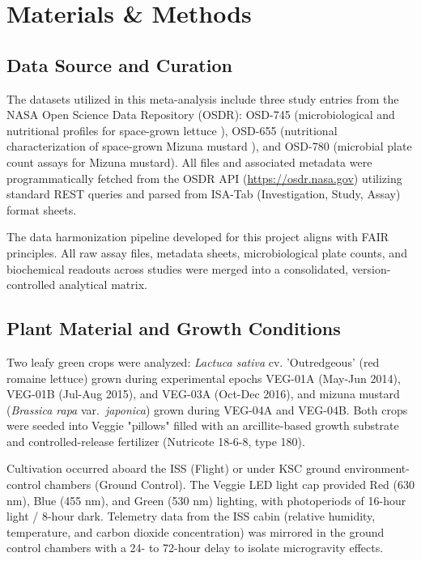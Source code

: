 \chapter{Materials \& Methods}
\label{ch:methods}

\section{Data Source and Curation}
The datasets utilized in this meta-analysis include three study entries from the NASA Open Science Data Repository (OSDR): OSD-745 (microbiological and nutritional profiles for space-grown lettuce \cite{khodadad2020}), OSD-655 (nutritional characterization of space-grown Mizuna mustard \cite{bunchek2024}), and OSD-780 (microbial plate count assays for Mizuna mustard). All files and associated metadata were programmatically fetched from the OSDR API (\url{https://osdr.nasa.gov}) utilizing standard REST queries and parsed from ISA-Tab (Investigation, Study, Assay) format sheets. 

\begin{coseagronomy}
The data harmonization pipeline developed for this project aligns with FAIR principles. All raw assay files, metadata sheets, microbiological plate counts, and biochemical readouts across studies were merged into a consolidated, version-controlled analytical matrix.
\end{coseagronomy}

\section{Plant Material and Growth Conditions}
Two leafy green crops were analyzed: \textit{Lactuca sativa} cv. 'Outredgeous' (red romaine lettuce) grown during experimental epochs VEG-01A (May-Jun 2014), VEG-01B (Jul-Aug 2015), and VEG-03A (Oct-Dec 2016), and mizuna mustard (\textit{Brassica rapa} var.\ \textit{japonica}) grown during VEG-04A and VEG-04B. Both crops were seeded into Veggie "pillows" filled with an arcillite-based growth substrate and controlled-release fertilizer (Nutricote 18-6-8, type 180).

Cultivation occurred aboard the ISS (Flight) or under KSC ground environment-control chambers (Ground Control). The Veggie LED light cap provided Red (630 nm), Blue (455 nm), and Green (530 nm) lighting, with photoperiods of 16-hour light / 8-hour dark. Telemetry data from the ISS cabin (relative humidity, temperature, and carbon dioxide concentration) was mirrored in the ground control chambers with a 24- to 72-hour delay to isolate microgravity effects.

